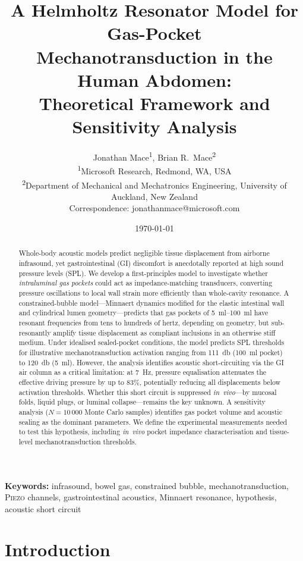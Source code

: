 \documentclass[12pt]{article}
\title{%
  A Helmholtz Resonator Model for Gas-Pocket\\
  Mechanotransduction in the Human Abdomen:\\
  Theoretical Framework and Sensitivity Analysis%
}
\author{%
  Jonathan Mace\textsuperscript{1},
  Brian R.\ Mace\textsuperscript{2}\\[4pt]
  \small \textsuperscript{1}Microsoft Research, Redmond, WA, USA\\
  \small \textsuperscript{2}Department of Mechanical and Mechatronics Engineering,
         University of Auckland, New Zealand\\[2pt]
  \small Correspondence: jonathanmace@microsoft.com%
}
\date{\today}
\newcommand{\piezo}{\textsc{Piezo}}
\begin{document}
\maketitle

\begin{abstract}
Whole-body acoustic models predict negligible tissue displacement from
airborne infrasound, yet gastrointestinal (GI) discomfort is anecdotally
reported at high sound pressure levels (SPL).  We develop a first-principles
model to investigate whether \emph{intraluminal gas pockets} could act as
impedance-matching transducers, converting pressure oscillations to local
wall strain more efficiently than whole-cavity resonance.  A
constrained-bubble model---Minnaert dynamics modified for the elastic
intestinal wall and cylindrical lumen geometry---predicts that gas pockets of
\SIrange{5}{100}{\milli\litre} have resonant frequencies from tens to
hundreds of hertz, depending on geometry, but sub-resonantly amplify tissue
displacement as compliant inclusions in an otherwise stiff medium.  Under
idealised sealed-pocket conditions, the model predicts SPL thresholds for
illustrative mechanotransduction activation ranging from
\SI{111}{\decibel} (\SI{100}{\milli\litre} pocket) to \SI{120}{\decibel}
(\SI{5}{\milli\litre}).  However, the analysis identifies acoustic
short-circuiting via the GI air column as a critical limitation: at
\SI{7}{\hertz}, pressure equalisation attenuates the effective driving
pressure by up to 83\%, potentially reducing all displacements below
activation thresholds.  Whether this short circuit is suppressed
\emph{in~vivo}---by mucosal folds, liquid plugs, or luminal
collapse---remains the key unknown.  A sensitivity analysis
($N = 10\,000$ Monte Carlo samples) identifies gas pocket volume and
acoustic sealing as the dominant parameters.  We define the experimental
measurements needed to test this hypothesis, including \emph{in~vivo}
pocket impedance characterisation and tissue-level mechanotransduction
thresholds.
\end{abstract}

\noindent\textbf{Keywords:}
infrasound, bowel gas, constrained bubble, mechanotransduction,
\piezo{} channels, gastrointestinal acoustics, Minnaert resonance,
hypothesis, acoustic short circuit


\section{Introduction}
\label{sec:intro}
\end{document}
